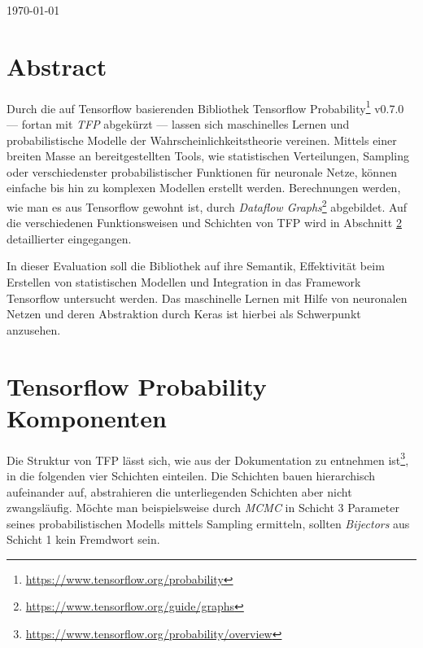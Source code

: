 \documentclass[12pt]{article}
\begin{document}
\begin{titlepage}
\begin{center}

\vspace{\fill} %

{\large \today}\\[3cm] %

\end{center}

\end{titlepage}



\tableofcontents

\newpage


\section{Abstract}
\label{abstract}
Durch die auf Tensorflow basierenden Bibliothek Tensorflow Probability\footnote{\url{https://www.tensorflow.org/probability}} v0.7.0 --- fortan mit \textit{TFP} abgekürzt --- lassen sich maschinelles Lernen und probabilistische Modelle der Wahrscheinlichkeitstheorie vereinen. Mittels einer breiten Masse an bereitgestellten Tools, wie statistischen Verteilungen, Sampling oder verschiedenster probabilistischer Funktionen für neuronale Netze, können einfache bis hin zu komplexen Modellen erstellt werden. Berechnungen werden, wie man es aus Tensorflow gewohnt ist, durch \textit{Dataflow Graphs}\footnote{\url{https://www.tensorflow.org/guide/graphs}} abgebildet. Auf die verschiedenen Funktionsweisen und Schichten von TFP wird in Abschnitt \ref{sec:tfp-components} detaillierter eingegangen.

In dieser Evaluation soll die Bibliothek auf ihre Semantik, Effektivität beim Erstellen von statistischen Modellen und Integration in das Framework Tensorflow untersucht werden. Das maschinelle Lernen mit Hilfe von neuronalen Netzen und deren Abstraktion durch Keras ist hierbei als Schwerpunkt anzusehen.

\section{Tensorflow Probability Komponenten}
\label{sec:tfp-components}
Die Struktur von TFP lässt sich, wie aus der Dokumentation zu entnehmen ist\footnote{\url{https://www.tensorflow.org/probability/overview}}, in die folgenden vier Schichten einteilen. Die Schichten bauen hierarchisch aufeinander auf, abstrahieren die unterliegenden Schichten aber nicht zwangsläufig. Möchte man beispielsweise durch \textit{MCMC} in Schicht 3 Parameter seines probabilistischen Modells mittels Sampling ermitteln, sollten \textit{Bijectors} aus Schicht 1 kein Fremdwort sein.
\end{document}
